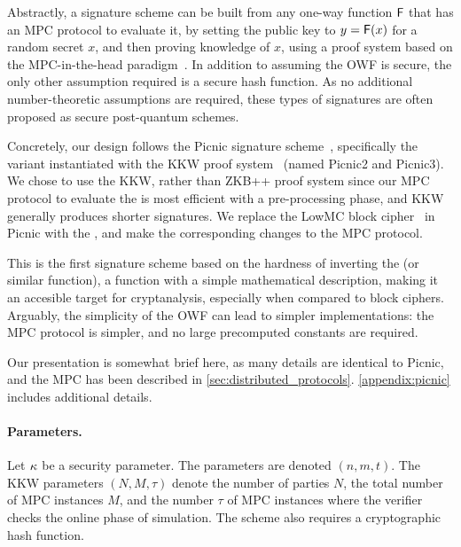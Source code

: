 Abstractly, a signature scheme can be built from any one-way function $\mathsf{F}$
that has an MPC protocol to evaluate it, by setting the public key to $y =
\mathsf{F}(x)$ for a random secret $x$, and then proving knowledge of $x$, using a
proof system based on the MPC-in-the-head paradigm~\cite{ishai2007-zkmpc}.  In
addition to assuming the OWF is secure, the only other assumption required is a
secure hash function. As no additional number-theoretic assumptions are
required, these types of signatures are often proposed as secure post-quantum
schemes. 

Concretely, our design follows the Picnic signature scheme~\cite{chase2017-picnic},
specifically the variant instantiated with the KKW proof
system~\cite{katz2018-pqsigs} (named Picnic2 and Picnic3).  We chose to use the
KKW, rather than ZKB++ proof system since our MPC protocol to evaluate the
\ttOWF is most efficient with a pre-processing phase, and KKW generally
produces shorter signatures.  We replace the LowMC block cipher~\cite{albrecht2015-lowmc} in Picnic 
with the \ttOWF, and make the corresponding changes to the MPC protocol. 

This is the first signature scheme based on the hardness of inverting the
\ttOWF (or similar function), a function with a simple mathematical
description, making it an accesible target for cryptanalysis, especially when
compared to block ciphers.  Arguably, the simplicity of the OWF can lead to
simpler implementations: the MPC protocol is simpler, and no large precomputed
constants are required. 

Our presentation is somewhat brief here, as many details are identical to Picnic, 
and the \ttOWF MPC has been described in \cref{sec:distributed_protocols}. \cref{appendix:picnic}
includes additional details. 

\paragraph{Parameters.} Let $\kappa$ be a security parameter.  The
\ttOWF parameters are denoted $(n, m, t)$.  The KKW parameters $(N, M,
\tau)$ denote the number of parties $N$, the total number of MPC instances $M$,
and the number $\tau$ of MPC instances where the verifier checks the online
phase of simulation.  The scheme also requires a cryptographic hash function. 


